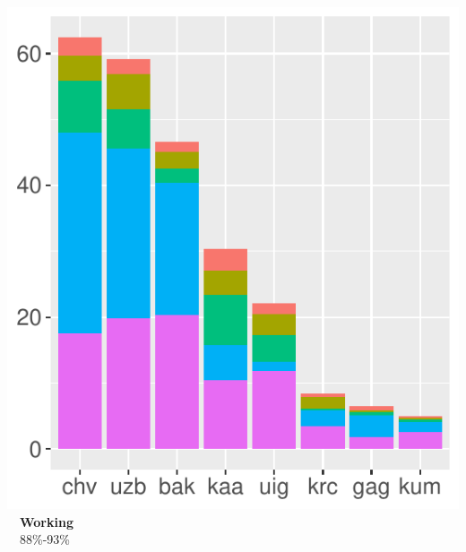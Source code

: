 \documentclass[a0paper,fleqn]{betterposter}
\begin{document}
{\begin{minipage}{0.356\textwidth}
    \includegraphics[width=\textwidth]{img/lgs2}\vspace{-0.8em}\\
    ~~{\color{orange}\textbf{Working}}\\
    ~~88\%-93\%
\end{minipage}
\begin{minipage}{0.317\textwidth}
    \centering

\end{minipage}}
\end{document}
